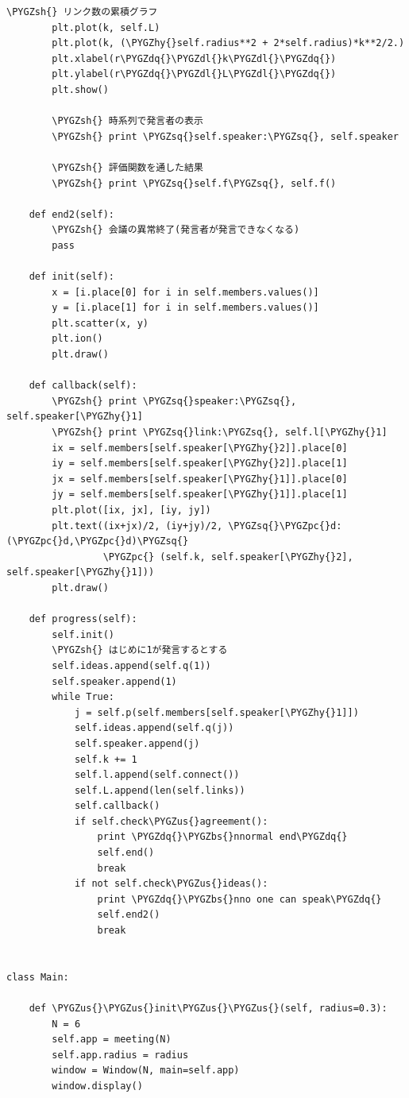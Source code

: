 \documentclass[letterpaper,10pt,english]{sphinxmanual}
\def\PYGZbs{\char`\\}
\def\PYGZus{\char`\_}
\def\PYGZsh{\char`\#}
\def\PYGZpc{\char`\%}
\def\PYGZdl{\char`\$}
\def\PYGZhy{\char`\-}
\def\PYGZsq{\char`\'}
\def\PYGZdq{\char`\"}
\begin{document}
\begin{Verbatim}[commandchars=\\\{\}]
        \PYGZsh{} リンク数の累積グラフ
        plt.plot(k, self.L)
        plt.plot(k, (\PYGZhy{}self.radius**2 + 2*self.radius)*k**2/2.)
        plt.xlabel(r\PYGZdq{}\PYGZdl{}k\PYGZdl{}\PYGZdq{})
        plt.ylabel(r\PYGZdq{}\PYGZdl{}L\PYGZdl{}\PYGZdq{})
        plt.show()

        \PYGZsh{} 時系列で発言者の表示
        \PYGZsh{} print \PYGZsq{}self.speaker:\PYGZsq{}, self.speaker

        \PYGZsh{} 評価関数を通した結果
        \PYGZsh{} print \PYGZsq{}self.f\PYGZsq{}, self.f()

    def end2(self):
        \PYGZsh{} 会議の異常終了(発言者が発言できなくなる)
        pass

    def init(self):
        x = [i.place[0] for i in self.members.values()]
        y = [i.place[1] for i in self.members.values()]
        plt.scatter(x, y)
        plt.ion()
        plt.draw()

    def callback(self):
        \PYGZsh{} print \PYGZsq{}speaker:\PYGZsq{}, self.speaker[\PYGZhy{}1]
        \PYGZsh{} print \PYGZsq{}link:\PYGZsq{}, self.l[\PYGZhy{}1]
        ix = self.members[self.speaker[\PYGZhy{}2]].place[0]
        iy = self.members[self.speaker[\PYGZhy{}2]].place[1]
        jx = self.members[self.speaker[\PYGZhy{}1]].place[0]
        jy = self.members[self.speaker[\PYGZhy{}1]].place[1]
        plt.plot([ix, jx], [iy, jy])
        plt.text((ix+jx)/2, (iy+jy)/2, \PYGZsq{}\PYGZpc{}d:(\PYGZpc{}d,\PYGZpc{}d)\PYGZsq{}
                 \PYGZpc{} (self.k, self.speaker[\PYGZhy{}2], self.speaker[\PYGZhy{}1]))
        plt.draw()

    def progress(self):
        self.init()
        \PYGZsh{} はじめに1が発言するとする
        self.ideas.append(self.q(1))
        self.speaker.append(1)
        while True:
            j = self.p(self.members[self.speaker[\PYGZhy{}1]])
            self.ideas.append(self.q(j))
            self.speaker.append(j)
            self.k += 1
            self.l.append(self.connect())
            self.L.append(len(self.links))
            self.callback()
            if self.check\PYGZus{}agreement():
                print \PYGZdq{}\PYGZbs{}nnormal end\PYGZdq{}
                self.end()
                break
            if not self.check\PYGZus{}ideas():
                print \PYGZdq{}\PYGZbs{}nno one can speak\PYGZdq{}
                self.end2()
                break


class Main:

    def \PYGZus{}\PYGZus{}init\PYGZus{}\PYGZus{}(self, radius=0.3):
        N = 6
        self.app = meeting(N)
        self.app.radius = radius
        window = Window(N, main=self.app)
        window.display()


\end{Verbatim}
\end{document}
